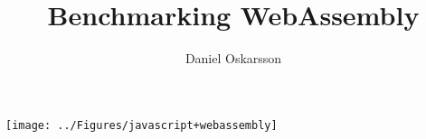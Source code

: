\documentclass[english,template=rapport]{his}
\title{Benchmarking WebAssembly}
\subtitle{}
\author{Daniel Oskarsson}
\begin{document}
\maketitle

\begin{comment}
\begin{abstract}
    \bigskip
    \normalsize
    \\
    \\
    \textbf{\labelKeywords:} 
\end{abstract}
\end{comment}

\clearpage
\tableofcontents
{}

\clearpage
{}


\clearpage


\clearpage


\clearpage


\clearpage


%

%

\clearpage
\printbibliography[heading=bibintoc]

\clearpage
\pagestyle{empty}
\centering
\texttt{[image: ../Figures/javascript+webassembly]}
\end{document}
